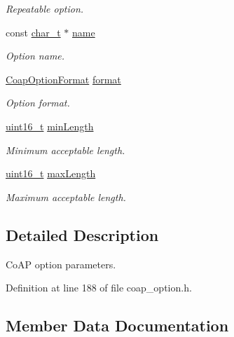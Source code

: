 \begin{DoxyCompactItemize}
\begin{DoxyCompactList}\small\item\em Repeatable option. \end{DoxyCompactList}\item 
const \hyperlink{compiler__port_8h_a40bb5262bf908c328fbcfbe5d29d0201}{char\+\_\+t} $\ast$ \hyperlink{structCoapOptionParameters_a151ae1dd2cf33031d384a3f351f18959}{name}
\begin{DoxyCompactList}\small\item\em Option name. \end{DoxyCompactList}\item 
\hyperlink{coap__option_8h_a0dafb13dafce37cff605bb260a1ed02e}{Coap\+Option\+Format} \hyperlink{structCoapOptionParameters_affe8a594bbb492d66201b65b65106949}{format}
\begin{DoxyCompactList}\small\item\em Option format. \end{DoxyCompactList}\item 
\hyperlink{stdint_8h_a273cf69d639a59973b6019625df33e30}{uint16\+\_\+t} \hyperlink{structCoapOptionParameters_a76c1e1cedbc6c598a519a8dff5eaa2c2}{min\+Length}
\begin{DoxyCompactList}\small\item\em Minimum acceptable length. \end{DoxyCompactList}\item 
\hyperlink{stdint_8h_a273cf69d639a59973b6019625df33e30}{uint16\+\_\+t} \hyperlink{structCoapOptionParameters_a8fd3fc81d691b88be52674fb5e585ed0}{max\+Length}
\begin{DoxyCompactList}\small\item\em Maximum acceptable length. \end{DoxyCompactList}\end{DoxyCompactItemize}


\subsection{Detailed Description}
Co\+AP option parameters. 

Definition at line 188 of file coap\+\_\+option.\+h.



\subsection{Member Data Documentation}
\mbox{\label{structCoapOptionParameters_aa01ccc66a6195f98f592cb8acacd54d2}} 
